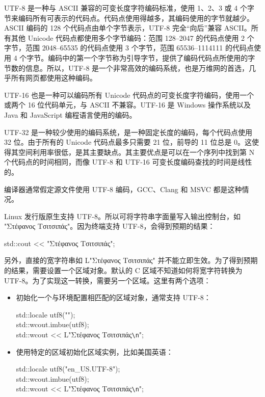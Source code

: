 UTF-8 是一种与 ASCII 兼容的可变长度字符编码标准，使用 1、2、3 或 4 个字节来编码所有可表示的代码点。代码点使用得越多，其编码使用的字节就越少。ASCII 编码的 128 个代码点由单个字节表示，UTF-8 完全“向后”兼容 ASCII。所有其他 Unicode 代码点都使用多个字节编码：范围 128–2047 的代码点使用 2 个字节，范围 2048–65535 的代码点使用 3 个字节，范围 65536–1114111 的代码点使用 4 个字节。编码中的第一个字节称为引导字节，提供了编码代码点所使用的字节数的信息。所以，UTF-8 是一个非常高效的编码系统，也是万维网的首选，几乎所有网页都使用这种编码。

UTF-16 也是一种可以编码所有 Unicode 代码点的可变长度字符编码，使用一个或两个 16 位代码单元，与 ASCII 不兼容。UTF-16 是 Windows 操作系统以及 Java 和 JavaScript 编程语言使用的编码。

UTF-32 是一种较少使用的编码系统，是一种固定长度的编码，每个代码点使用 32 位。由于所有的 Unicode 代码点最多只需要 21 位，前导的 11 位总是 0。这使得其空间利用率很低，是其主要缺点。其主要优点是可以在一个序列中找到第 N 个代码点的时间相同，而像 UTF-8 和 UTF-16 可变长度编码查找的时间是线性的。

编译器通常假定源文件使用 UTF-8 编码，GCC、Clang 和 MSVC 都是这种情况。

Linux 发行版原生支持 UTF-8。所以可将字符串字面量写入输出控制台，如 "Στέφανος Τσιτσιπάς"。因为终端支持 UTF-8，会得到预期的结果：

\begin{tcolorbox}[ breakable,colback = blue!5!white, colframe=black!7!white]
\scriptsize{
std::cout <{}< "Στέφανος Τσιτσιπάς";
}
\end{tcolorbox}

另外，直接的宽字符串如 L"Στέφανος Τσιτσιπάς" 并不能立即生效。为了得到预期的结果，需要设置一个区域对象。默认的 C 区域不知道如何将宽字符转换为 UTF-8。为了实现这一转换，需要另一个区域。这里有两个选项：

\begin{itemize}
\item
初始化一个与环境配置相匹配的区域对象，通常支持 UTF-8：

\begin{tcolorbox}[ breakable,colback = blue!5!white, colframe=black!7!white]
\scriptsize{
std::locale utf8(""); \\
std::wcout.imbue(utf8); \\
std::wcout <{}< L"Στέφανος Τσιτσιπάς\verb|\n|";
}
\end{tcolorbox}

\item
使用特定的区域初始化区域实例，比如美国英语：

\begin{tcolorbox}[ breakable,colback = blue!5!white, colframe=black!7!white]
\scriptsize{
std::locale utf8("en\_US.UTF-8"); \\
std::wcout.imbue(utf8); \\
std::wcout <{}< L"Στέφανος Τσιτσιπάς\verb|\n|";
}
\end{tcolorbox}

\end{itemize}

